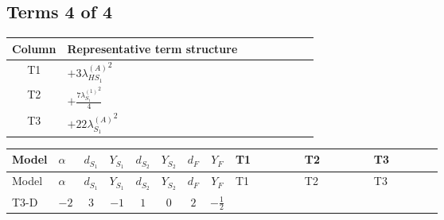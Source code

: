 \documentclass[8pt]{article}
\begin{document}
\begin{landscape}
\subsection*{Terms 4 of 4}
\begin{center}
\begin{tabular}{@{}c >{\raggedright\arraybackslash}p{0.82\linewidth}@{}}
\toprule
Column & Representative term structure \\
\midrule
T1 & \(\displaystyle +3 {\lambda_{HS_1}^{(A)}}^2\) \\
\midrule
T2 & \(\displaystyle +\frac{7 {\lambda_{S_1}^{(1)}}^2}{4}\) \\
\midrule
T3 & \(\displaystyle +22 {\lambda_{S_1}^{(A)}}^2\) \\
\midrule
\bottomrule
\end{tabular}
\end{center}
\smallskip
\tiny
\begin{longtable}{@{}llcccccc >{\raggedright\arraybackslash}p{0.21\linewidth} >{\raggedright\arraybackslash}p{0.21\linewidth} >{\raggedright\arraybackslash}p{0.21\linewidth}@{}}
\toprule
Model & $\alpha$ & $d_{S_1}$ & $Y_{S_1}$ & $d_{S_2}$ & $Y_{S_2}$ & $d_F$ & $Y_F$ & T1 & T2 & T3 \\
\midrule
\endfirsthead
\toprule
Model & $\alpha$ & $d_{S_1}$ & $Y_{S_1}$ & $d_{S_2}$ & $Y_{S_2}$ & $d_F$ & $Y_F$ & T1 & T2 & T3 \\
\midrule
\endhead
T3-D & $-2$ & $3$ & $-1$ & $1$ & $0$ & $2$ & $-\frac{1}{2}$ & \scriptsize\adjustbox{max width=\linewidth}{$\begin{gathered} +3 {\lambda_{HS_1}^{(A)}}^2\end{gathered}$} & \scriptsize\adjustbox{max width=\linewidth}{$\begin{gathered} +\frac{7 {\lambda_{S_1}^{(1)}}^2}{4}\end{gathered}$} & \scriptsize\adjustbox{max width=\linewidth}{$\begin{gathered} +22 {\lambda_{S_1}^{(A)}}^2\end{gathered}$} \\
\midrule
\bottomrule
\end{longtable}
\end{landscape}
\end{document}
